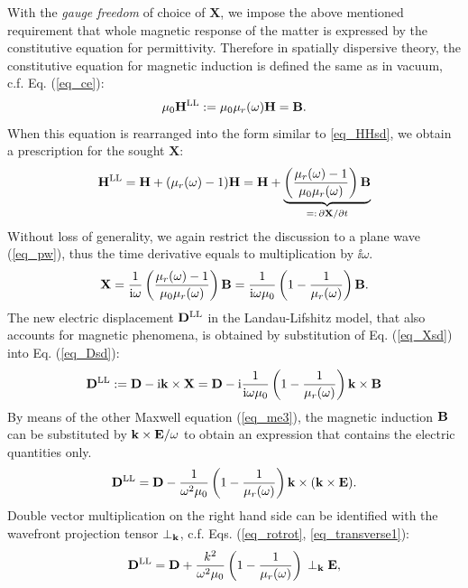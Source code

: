 With the \textit{gauge freedom} of choice of $\mathbf{X}$, we impose the above mentioned requirement that whole magnetic response of the matter is expressed by the constitutive equation for permittivity. Therefore in spatially dispersive theory, the constitutive equation 
for magnetic induction is defined the same as in vacuum, c.f. Eq. (\ref{eq_ce}):
\begin{equation} \mu_0 {\mathbf{H}^\text{LL}} := \mu_0 \mu_r(\omega) \mathbf{H} = \mathbf{B}. \label{eq_mu_sd}\end{equation}
When this equation is rearranged into the form similar to \ref{eq_HHsd}, we obtain a prescription for the sought $\mathbf{X}$: 
$$ {\mathbf{H}^\text{LL}} = \mathbf{H} + (\mu_r(\omega) -1)\mathbf{H} = \mathbf{H} + \underbrace{\left(\frac{\mu_r(\omega)-1}{\mu_0\mu_r(\omega)}\right)\mathbf{B}}_{=:\,\partial\mathbf{X}/\partial t}$$
Without loss of generality, we again restrict the discussion to a plane wave (\ref{eq_pw}), thus the time derivative equals to multiplication by $\ii\omega$.
\begin{equation} \mathbf{X} = \frac{1}{{\mathrm i}\omega}\left(\frac{\mu_r(\omega)-1}{\mu_0\mu_r(\omega)}\right)\mathbf{B} = \frac{1}{{\mathrm i}\omega\mu_0}\left(1 - \frac{1}{\mu_r(\omega)}\right)\mathbf{B}. \label{eq_Xsd}\end{equation}
The new electric displacement ${\mathbf{D}^\text{LL}}$ in the  Landau-Lifshitz model, that also accounts for magnetic phenomena, is obtained by substitution of Eq. (\ref{eq_Xsd}) into Eq. (\ref{eq_Dsd}):
\begin{equation} {\mathbf{D}^\text{LL}} := \mathbf{D} - {\mathrm i}{\mathbf{k}}\times \mathbf{X} =  \mathbf{D} - {\mathrm i}  \frac{1}{{\mathrm i}\omega\mu_0}\left(1 - \frac{1}{\mu_r(\omega)}\right) {\mathbf{k}}\times \mathbf{B}  \label{eq_Dsd2}\end{equation}
By means of the other Maxwell equation (\ref{eq_me3}), the magnetic induction $\mathbf{B}$ can be substituted by ${\mathbf{k}}\times\mathbf{E} / \omega$ to obtain an expression that contains the electric quantities only.
\begin{equation} {\mathbf{D}^\text{LL}} = \mathbf{D} - \frac{1}{\omega^2 \mu_0}\left(1 - \frac{1}{\mu_r(\omega)}\right) {\mathbf{k}}\times({\mathbf{k}}\times \mathbf{E}).  \label{eq_Dsd3}\end{equation} 
Double vector multiplication on the right hand side can be identified with the wavefront projection tensor $\perp_{\mathbf{k}}$, c.f. Eqs. (\ref{eq_rotrot}, \ref{eq_transverse1}):
\begin{equation} {\mathbf{D}^\text{LL}} = \mathbf{D} + \frac{k^2}{\omega^2 \mu_0}\left(1 - \frac{1}{\mu_r(\omega)}\right) \, \perp_{\mathbf{k}} \mathbf{E},  \label{eq_Dsd4}\end{equation} 

